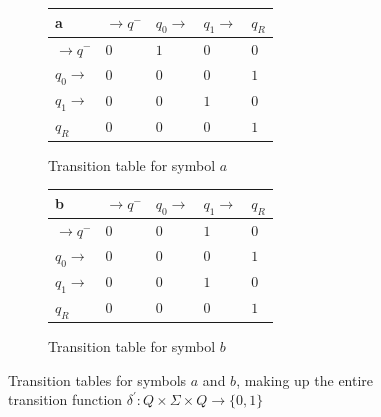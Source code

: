 \documentclass{article}
\begin{document}
%
%
\begin{figure}
\begin{center}

	\setlength{\tabcolsep}{4pt}
	\renewcommand{\arraystretch}{1.4}
	
	\begin{subfigure}{.5\textwidth}

	\centering
	\begin{tabular}{|P{1.0cm} || P{0.8cm} | P{0.8cm} | P{0.8cm} | P{0.8cm}|}

	\hline
	a & $\rightarrow q^-$ & $q_0 \rightarrow$ & $q_1 \rightarrow$ & $q_R$ \\
	\hline
	\hline
	$\rightarrow q^-$ 		& $0$ & $1$ & $0$ & $0$ \\
	\hline
	$q_0 \rightarrow$ 		& $0$ & $0$ & $0$ & $1$ \\
	\hline
	$q_1 \rightarrow$ 		& $0$ & $0$ & $1$ & $0$ \\
	\hline
	$q_R$  					& $0$ & $0$ & $0$ & $1$ \\
	\hline

	\end{tabular}

	\caption{Transition table for symbol $a$}
	\label{fig:ttable_bin_a}	
	
	\end{subfigure}%
	\begin{subfigure}{.5\textwidth}
	
	\centering
	\begin{tabular}{|P{1.0cm} || P{0.8cm} | P{0.8cm} | P{0.8cm} | P{0.8cm}|}
	
	\hline
	b & $\rightarrow q^-$ & $q_0 \rightarrow$ & $q_1 \rightarrow$ & $q_R$ \\
	\hline
	\hline
	$\rightarrow q^-$ 		& $0$ & $0$ & $1$ & $0$ \\
	\hline
	$q_0 \rightarrow$ 		& $0$ & $0$ & $0$ & $1$ \\
	\hline
	$q_1 \rightarrow$ 		& $0$ & $0$ & $1$ & $0$ \\
	\hline
	$q_R$  					& $0$ & $0$ & $0$ & $1$ \\
	\hline

	\end{tabular}
	
	\caption{Transition table for symbol $b$}
	\label{fig:ttable_bin_b}
	
	\end{subfigure}%

	
\caption{Transition tables for symbols $a$ and $b$, making up the entire transition function $\delta^{'}: Q \times \Sigma \times Q \rightarrow \{0,1\}$}

\label{fig:ttable_bin}
\end{center}
\end{figure}
\end{document}
